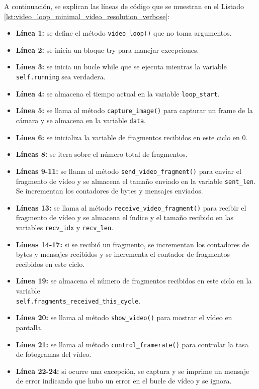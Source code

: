 A continuación, se explican las líneas de código que se muestran en el Listado \ref{lst:video_loop_minimal_video_resolution_verbose}:
\begin{itemize}
    \item \textbf{Línea 1:} se define el método \texttt{video\_loop()} que no toma argumentos.
    \item \textbf{Línea 2:} se inicia un bloque try para manejar excepciones.
    \item \textbf{Línea 3:} se inicia un bucle while que se ejecuta mientras la variable \texttt{self.running} sea verdadera.
    \item \textbf{Línea 4:} se almacena el tiempo actual en la variable \texttt{loop\_start}.
    \item \textbf{Línea 5:} se llama al método \texttt{capture\_image()} para capturar un frame de la cámara y se almacena en la variable \texttt{data}.
    \item \textbf{Línea 6:} se inicializa la variable de fragmentos recibidos en este ciclo en 0.
    \item \textbf{Líneas 8:} se itera sobre el número total de fragmentos.
    \item \textbf{Líneas 9-11:} se llama al método \texttt{send\_video\_fragment()} para enviar el fragmento de vídeo y se almacena el tamaño enviado en la variable \texttt{sent\_len}. Se incrementan los contadores de bytes y mensajes enviados.
    \item \textbf{Líneas 13:} se llama al método \texttt{receive\_video\_fragment()} para recibir el fragmento de vídeo y se almacena el índice y el tamaño recibido en las variables \texttt{recv\_idx} y \texttt{recv\_len}.
    \item \textbf{Líneas 14-17:} si se recibió un fragmento, se incrementan los contadores de bytes y mensajes recibidos y se incrementa el contador de fragmentos recibidos en este ciclo.
    \item \textbf{Línea 19:} se almacena el número de fragmentos recibidos en este ciclo en la variable\\
    \texttt{self.fragments\_received\_this\_cycle}.
    \item \textbf{Línea 20:} se llama al método \texttt{show\_video()} para mostrar el vídeo en pantalla.
    \item \textbf{Línea 21:} se llama al método \texttt{control\_framerate()} para controlar la tasa de fotogramas del vídeo.
    \item \textbf{Línea 22-24:} si ocurre una excepción, se captura y se imprime un mensaje de error indicando que hubo un error en el bucle de vídeo y se ignora.
\end{itemize}
\vspace{\baselineskip}

